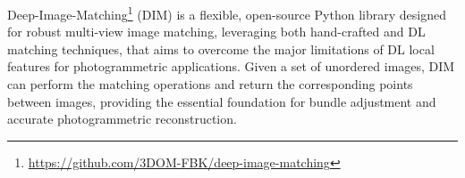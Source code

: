 
Deep-Image-Matching\footnote{\url{https://github.com/3DOM-FBK/deep-image-matching}} (DIM) is a flexible, open-source Python library designed for robust multi-view image matching, leveraging both hand-crafted and DL matching techniques, that aims to overcome the major limitations of DL local features for photogrammetric applications.  
Given a set of unordered images, DIM can perform the matching operations and return the corresponding points between images, providing the essential foundation for bundle adjustment and accurate photogrammetric reconstruction.

